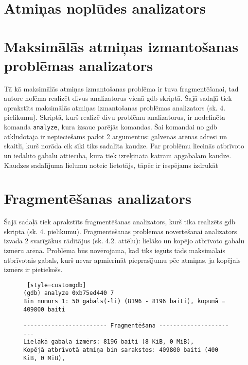 \section{Atmiņas noplūdes analizators}

\section{Maksimālās atmiņas izmantošanas problēmas analizators}
Tā kā maksimālās atmiņas izmantošanas problēma ir tuva fragmentēšanai, tad autore nolēma realizēt divus analizatorus vienā gdb skriptā.
Šajā sadaļā tiek aprakstīts maksimālās atmiņas izmantošanas problēmas analizators (sk. 4. pielikumu).
Skriptā, kurš realizē divu problēmu analizatorus, ir nodefinēta komanda \texttt{analyze}, kura izsauc parējās komandas.
Šai komandai no gdb atkļūdotāja ir nepieciešams padot 2 argumentus: galvenās arēnas adresi un skaitli, kurš norāda cik sīki tiks sadalīta kaudze.
Par problēmu liecinās atbrīvoto un iedalīto gabalu attiecība, kura tiek izrēķināta katram apgabalam kaudzē.
Kaudzes sadalījuma lielumu noteic lietotājs, tāpēc ir iespējams izdrukāt 



\section{Fragmentēšanas analizators}
Šajā sadaļā tiek aprakstīts fragmentēšanas analizators, kurš tika realizēts gdb skriptā (sk. 4. pielikumu).
Fragmentēšanas problēmas novērtēšanai analizators izvada 2 svarīgākus rādītājus (sk. 4.2. attēlu): lielāko un kopējo atbrīvoto gabalu izmēru arēnā.
Problēma būs novērojama, kad tiks iegūts tāds maksimālais atbrīvotais gabals, kurš nevar apmierināt pieprasījumu pēc atmiņas, ja kopējais izmērs ir pietiekošs.

\begin{figure}[h]
\begin{lstlisting} [style=customgdb]
(gdb) analyze 0xb75ed440 7
Bin numurs 1: 50 gabals(-li) (8196 - 8196 baiti), kopumā = 409800 baiti

------------------------ Fragmentēšana -----------------------
Lielākā gabala izmērs: 8196 baiti (8 KiB, 0 MiB),
Kopējā atbrīvotā atmiņa bin sarakstos: 409800 baiti (400 KiB, 0 MiB),
\end{lstlisting}
\caption{\textbf{\fontsize{11}{12}\selectfont {Fragmentēšanas rādītāji}}}
\end{figure}

